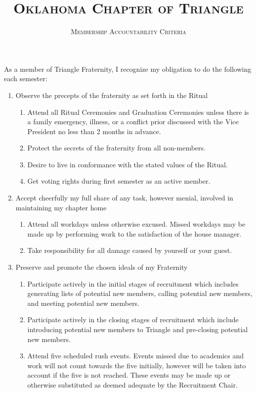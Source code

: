 \documentclass{article}
\title{\textsc{Oklahoma Chapter of Triangle}}
\subtitle{\textsc{Membership Accountability Criteria}}
\begin{document}
\maketitle

\setlength\parindent{0pt}

As a member of Triangle Fraternity, I recognize my obligation to do the following each semester:

\begin{enumerate}
    \item Observe the precepts of the fraternity as set forth in the Ritual
    \begin{enumerate}
        \item Attend all Ritual Ceremonies and Graduation Ceremonies unless there is a family emergency, illness, or a conflict prior discussed with the Vice President no less than 2 months in advance.
        \item Protect the secrets of the fraternity from all non-members.
        \item Desire to live in conformance with the stated values of the Ritual.
        \item Get voting rights during first semester as an active member.
    \end{enumerate}
    \item Accept cheerfully my full share of any task, however menial, involved in maintaining my chapter home
    \begin{enumerate}
        \item Attend all workdays unless otherwise excused. Missed workdays may be made up by performing work to the satisfaction of the house manager.
        \item Take responsibility for all damage caused by yourself or your guest.
    \end{enumerate}
    \item Preserve and promote the chosen ideals of my Fraternity
    \begin{enumerate}
        \item Participate actively in the initial stages of recruitment which includes generating lists of potential new members, calling potential new members, and meeting potential new members.
        \item Participate actively in the closing stages of recruitment which include introducing potential new members to Triangle and pre-closing potential new members.
        \item Attend five scheduled rush events. Events missed due to academics and work will not count towards the five initially, however will be taken into account if the five is not reached. These events may be made up or otherwise substituted as deemed adequate by the Recruitment Chair.

\end{enumerate}
\end{enumerate}
\end{document}
